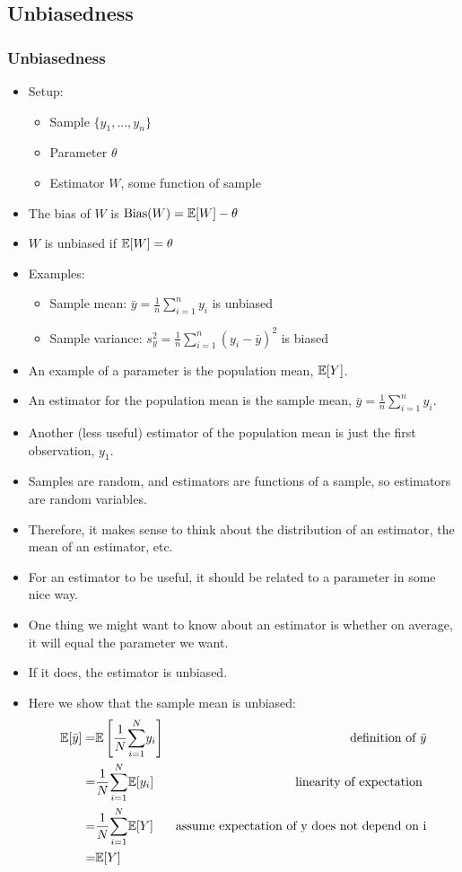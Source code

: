 \subsection{Unbiasedness}
\begin{frame}[allowframebreaks]\frametitle{Unbiasedness}
  \begin{itemize}
  \item Setup: 
    \begin{itemize}
    \item Sample $\{y_1, ..., y_n \}$
    \item Parameter $\theta$
    \item Estimator $W$, some function of sample
    \end{itemize}
  \item The \alert{bias} of $W$ is $\mathrm{Bias}(W) = \mathbb{E}[W] - \theta$
  \item $W$ is \alert{unbiased} if $\mathbb{E}[W] = \theta$
  \item Examples: 
    \begin{itemize}
    \item Sample mean: $\bar{y} = \frac{1}{n} \sum_{i=1}^n y_i$ is
      unbiased
    \item Sample variance: $s_y^2 = \frac{1}{n} \sum_{i=1}^n (y_i -
      \bar{y})^2$ is biased
    \end{itemize}
 \framebreak
\item An example of a parameter is the population mean, $\mathbb{E}[Y]$. 
\item An estimator for the population mean is the sample mean, $\bar{y} =
\frac{1}{n} \sum_{i=1}^n y_i$. 
\item Another (less useful) estimator of the
population mean is just the first observation, $y_1$. 
\item Samples are
random, and estimators are functions of a sample, so estimators are
random variables. 
\item Therefore, it makes sense to think about the
distribution of an estimator, the mean of an estimator, etc. 
\framebreak
\item For an estimator to be useful, it should be related to a parameter in
some nice way. 
\item One thing we might want to know about an estimator is
whether on average, it will equal the parameter we want. 
\item If it does,
the estimator is unbiased. 

\item Here we show that the sample mean is unbiased:
\begin{align*}
  \mathbb{E}[\bar{y}] = & \mathbb{E}\left[\frac{1}{N} \underset{i=1}{\overset{N}{\sum}} y_i \right] & \text{definition of }
                                               \bar{y} \\
  = & \frac{1}{N} \underset{i=1}{\overset{N}{\sum}} \mathbb{E}[y_i] &  \text{linearity of expectation } \\
  = & \frac{1}{N} \underset{i=1}{\overset{N}{\sum}} \mathbb{E}[Y] & \text{assume expectation of y does not depend on
                    i} \\
  = & \mathbb{E}[Y]
\end{align*}


\end{itemize}
\end{frame}
